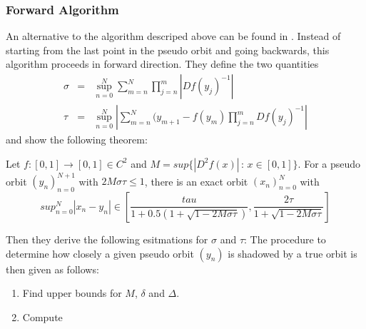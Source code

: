     \subsubsection{Forward Algorithm}
    An alternative to the algorithm descriped above can be found in \cite{chow1991}.
    Instead of starting from the last point in the pseudo orbit and going backwards, this algorithm proceeds in forward direction.
    They define the two quantities
    \begin{eqnarray*}
    \sigma & = & \sup^N_{n=0} \sum_{m=n}^N  \prod_{j=n}^{m} | Df(y_j)^{-1} |  \\
    \tau & = & \sup^N_{n=0} | \sum_{m=n}^N (y_{m+1}-f(y_m)\prod_{j=n}^{m} Df(y_j)^{-1}  |
    \end{eqnarray*}
    and show the following theorem:
    \begin{theorem}
    Let $f: [0,1] \to [0,1] \in C^2$ and $M = sup \{|D^2f(x)| \,:\, x \in [0,1] \}$.
    For a pseudo orbit $(y_n)_{n=0}^{N+1}$ with $2M\sigma\tau \leq 1$, there is an exact orbit $(x_n)_{n=0}^N$  with 
    $$sup_{n=0}^N |x_n - y_n| \in [\frac{tau}{1+0.5(1+\sqrt{1-2M\sigma \tau})}, \frac{2\tau}{1+\sqrt {1-2M\sigma \tau}}]$$
    \end{theorem}
    Then they derive the following esitmations for $\sigma$ and $\tau$:
    The procedure to determine how closely a given pseudo orbit $(y_n)$ is shadowed by a true orbit is then given as follows:
    \begin{enumerate}
      \item Find upper bounds for $M$, $\delta$ and $\Delta$.
      \item Compute 
      \begin{eqnarray*}
      
      \end{eqnarray*}
    \end{enumerate}
